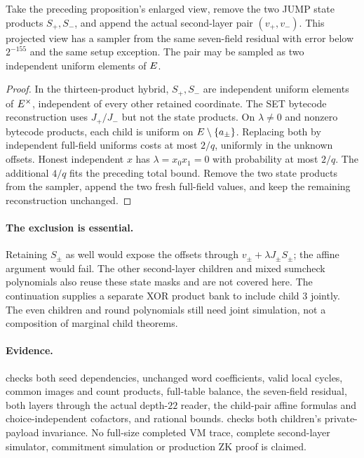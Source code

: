 \begin{proposition}
Take the preceding proposition's enlarged view, remove the two JUMP state products $S_+,S_-$, and append the actual second-layer pair $(v_+,v_-)$. This projected view has a sampler from the same seven-field residual with error below $2^{-155}$ and the same setup exception. The pair may be sampled as two independent uniform elements of $E$.
\end{proposition}
\begin{proof}
In the thirteen-product hybrid, $S_+,S_-$ are independent uniform elements of $E^\times$, independent of every other retained coordinate. The SET bytecode reconstruction uses $J_+/J_-$ but not the state products. On $\lambda\ne0$ and nonzero bytecode products, each child is uniform on $E\setminus\{a_\pm\}$. Replacing both by independent full-field uniforms costs at most $2/q$, uniformly in the unknown offsets. Honest independent $x$ has $\lambda=x_0x_1=0$ with probability at most $2/q$. The additional $4/q$ fits the preceding total bound. Remove the two state products from the sampler, append the two fresh full-field values, and keep the remaining reconstruction unchanged.
\end{proof}

\paragraph{The exclusion is essential.} Retaining $S_\pm$ as well would expose the offsets through $v_\pm+\lambda J_\pm S_\pm$; the affine argument would fail. The other second-layer children and mixed sumcheck polynomials also reuse these state masks and are not covered here. The continuation  supplies a separate XOR product bank to include child $3$ jointly. The even children and round polynomials still need joint simulation, not a composition of marginal child theorems.

\paragraph{Evidence.}  checks both seed dependencies, unchanged word coefficients, valid local cycles, common images and count products, full-table balance, the seven-field residual, both layers through the actual depth-$22$ reader, the child-pair affine formulas and choice-independent cofactors, and rational bounds.  checks both children's private-payload invariance. No full-size completed VM trace, complete second-layer simulator, commitment simulation or production ZK proof is claimed.
